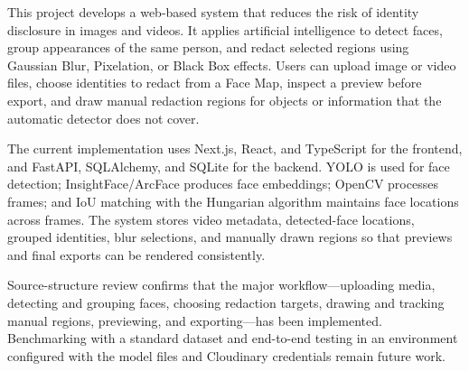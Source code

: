 This project develops a web-based system that reduces the risk of identity disclosure in images and videos. It applies artificial intelligence to detect faces, group appearances of the same person, and redact selected regions using Gaussian Blur, Pixelation, or Black Box effects. Users can upload image or video files, choose identities to redact from a Face Map, inspect a preview before export, and draw manual redaction regions for objects or information that the automatic detector does not cover.

The current implementation uses Next.js, React, and TypeScript for the frontend, and FastAPI, SQLAlchemy, and SQLite for the backend. YOLO is used for face detection; InsightFace/ArcFace produces face embeddings; OpenCV processes frames; and IoU matching with the Hungarian algorithm maintains face locations across frames. The system stores video metadata, detected-face locations, grouped identities, blur selections, and manually drawn regions so that previews and final exports can be rendered consistently.

Source-structure review confirms that the major workflow---uploading media, detecting and grouping faces, choosing redaction targets, drawing and tracking manual regions, previewing, and exporting---has been implemented. Benchmarking with a standard dataset and end-to-end testing in an environment configured with the model files and Cloudinary credentials remain future work.
